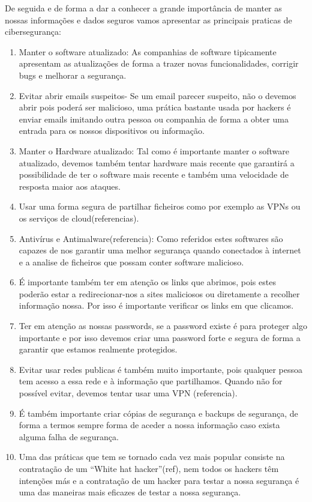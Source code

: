 \documentclass{report}
\begin{document}
De seguida e de forma a dar a conhecer a grande importância de manter as nossas informações e dados seguros vamos apresentar as principais praticas de cibersegurança:
\begin{enumerate}

\item Manter o software atualizado: As companhias de software tipicamente apresentam as atualizações de forma a trazer novas funcionalidades, corrigir bugs e melhorar a segurança.
\item Evitar abrir emails suspeitos- Se um email parecer suspeito, não o devemos abrir pois poderá ser malicioso, uma prática bastante usada por hackers é enviar emails imitando outra pessoa ou companhia de forma a obter uma entrada para os nossos dispositivos ou informação.
\item Manter o Hardware atualizado: Tal como é importante manter o software atualizado, devemos também tentar hardware mais recente que garantirá a possibilidade de ter o software mais recente e também uma velocidade de resposta maior aos ataques.
\item Usar uma forma segura de partilhar ficheiros como por exemplo as VPNs ou os serviços de cloud(referencias).
\item Antivírus e Antimalware(referencia): Como referidos estes softwares são capazes de nos garantir uma melhor segurança quando conectados à internet e a analise de ficheiros que possam conter software malicioso.
\item	É importante também ter em atenção os links que abrimos, pois estes poderão estar a redirecionar-nos a sites maliciosos ou diretamente a recolher informação nossa. Por isso é importante verificar os links em que clicamos.
\item Ter em atenção as nossas passwords, se a password existe é para proteger algo importante e por isso devemos criar uma password forte e segura de forma a garantir que estamos realmente protegidos.
\item Evitar usar redes publicas é também muito importante, pois qualquer pessoa tem acesso a essa rede e à informação que partilhamos. Quando não for possível evitar, devemos tentar usar uma VPN (referencia).
\item É também importante criar cópias de segurança e backups de segurança, de forma a termos sempre forma de aceder a nossa informação caso exista alguma falha de segurança.
\item Uma das práticas que tem se tornado cada vez mais popular consiste na contratação de um “White hat hacker”(ref), nem todos os hackers têm intenções más e a contratação de um hacker para testar a nossa segurança é uma das maneiras mais eficazes de testar a nossa segurança.
\end{enumerate} 
\end{document}

